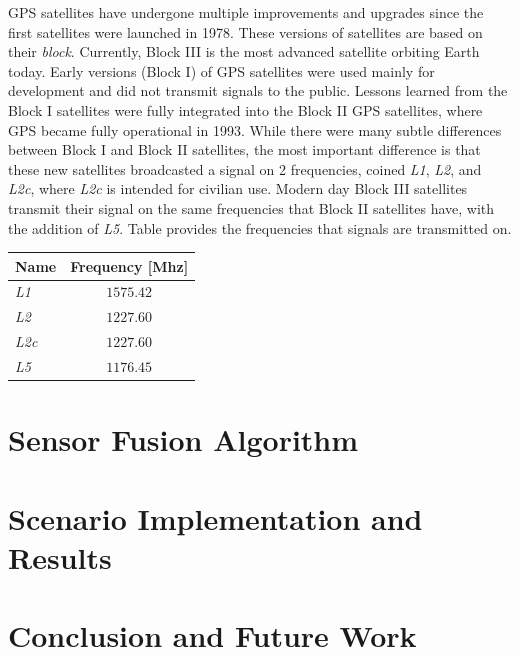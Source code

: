 \documentclass[12pt]{report}
\begin{document}
GPS satellites have undergone multiple improvements and upgrades since the first satellites were launched in 1978. These versions of satellites are based on their \textit{block}. Currently, Block III is the most advanced satellite orbiting Earth today. Early versions (Block I) of GPS satellites were used mainly for development and did not transmit signals to the public. Lessons learned from the Block I satellites were fully integrated into the Block II GPS satellites, where GPS became fully operational in 1993. While there were many subtle differences between Block I and Block II satellites, the most important difference is that these new satellites broadcasted a signal on 2 frequencies, coined \textit{L1}, \textit{L2}, and \textit{L2c}, where \textit{L2c} is intended for civilian use. Modern day Block III satellites transmit their signal on the same frequencies that Block II satellites have, with the addition of \textit{L5}. Table provides the frequencies that signals are transmitted on.

\begin{table}[h!]\label{tbl:GPSfreq}
  \centering
  \begin{tabular}{lc}
    \toprule
    \textbf{Name} & \textbf{Frequency [Mhz]} \\
    \midrule
    \textit{L1}   & \(1575.42\)              \\
    \textit{L2}   & \(1227.60\)              \\
    \textit{L2c}  & \(1227.60\)              \\
    \textit{L5}   & \(1176.45\)              \\
    \bottomrule
  \end{tabular}
\end{table}


\chapter{Sensor Fusion Algorithm}

\chapter{Scenario Implementation and Results}

\chapter{Conclusion and Future Work}

\appendix
\end{document}
